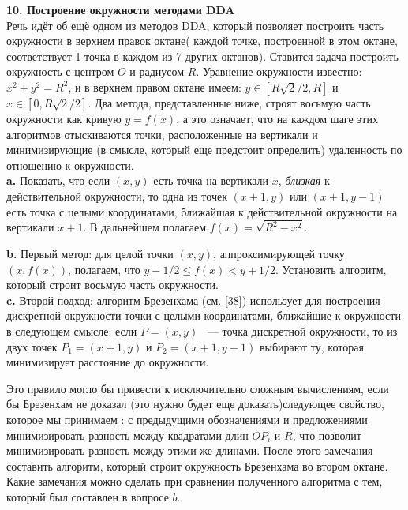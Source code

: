 \noindent\textbf { 10. Построение окружности методами DDA}\ \newline
\\
Речь идёт об ещё одном из методов DDA, который позволяет построить часть окружности в верхнем правок октане( каждой точке, построенной в этом октане, соответствует 1 точка в каждом из 7 других октанов). Ставится задача построить окружность с центром $O$ и радиусом $R$. Уравнение окружности известно: $x^{2}+y^{2}=R^{2}$, и в верхнем правом октане имеем: $y\in{\left[{R\sqrt{2}/2,R}\right]}$ и $ x\in{\left[{0,R\sqrt{2}/2}\right]}$. Два метода, представленные ниже, строят восьмую часть окружности как кривую $y=f\left({x}\right)$, а это означает, что на каждом шаге этих алгоритмов отыскиваются точки, расположенные на вертикали и минимизирующие (в смысле, который еще предстоит определить) удаленность по отношению к окружности. \newline
\\
\hspace*{15pt}\textbf{ a.} Показать, что если $\left({x,y}\right)$ есть точка на вертикали $x$, \textit{близкая} к действительной окружности, то одна из точек $\left({x+1,y}\right)$ или  $\left({x+1,y-1}\right)$ есть точка с целыми координатами, ближайшая к действительной окружности на вертикали $x+1$. В дальнейшем полагаем $f\left({x}\right)=\sqrt{R^{2}-x^{2}}$.
\pagebreak
	

\noindent\hspace*{15pt}\textbf{ b.} Первый метод: для целой точки $\left({x,y}\right)$, аппроксимирующей точку $\left(x,f(x)\right)$, полагаем, что $y-1/2\leqslant{f\left({x}\right)}<y+1/2$. Установить алгоритм, который строит восьмую часть окружности. \newline
\\
\hspace*{15pt}\textbf{ c.} Второй подход: алгоритм Брезенхама (см. [38]) использует для построения дискретной окружности точки с целыми координатами, ближайшие к окружности в следующем смысле:  если $P=\left({x,y}\right)$ ~--- точка дискретной окружности, то из двух точек  $P_{1}=\left({x+1,y}\right)$ и  $P_{2}=\left({x+1,y-1}\right)$ выбирают ту, которая минимизирует расстояние до окружности. 

Это правило могло бы привести к исключительно сложным вычислениям, если бы Брезенхам не доказал (это нужно будет еще доказать)следующее свойство, которое мы принимаем : с предыдущими обозначениями и предложениями минимизировать разность между квадратами длин $OP_{i}$ и $R$, что позволит минимизировать разность между этими же длинами. После этого замечания составить алгоритм, который строит окружность Брезенхама во втором октане. Какие замечания можно сделать при сравнении полученного алгоритма с тем, который был составлен в вопросе $b$.\newline
\\

